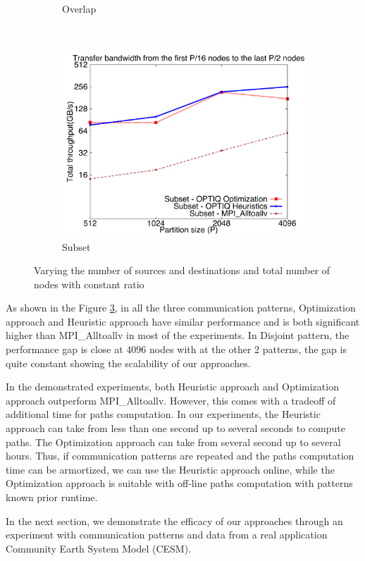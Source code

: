 \begin{figure}[!htbp]
\begin{subfigure}[b]{0.32\textwidth}
                \caption{Overlap}
                \label{fig:constantr_overlap_msg}
        \end{subfigure}
        ~ %
        \begin{subfigure}[b]{0.32\textwidth}
                \includegraphics[width=\textwidth]{figures/constantr_subset_msg.pdf}
                \caption{Subset}
                \label{fig:constantr_subset_msg}
        \end{subfigure}
	\vspace{-0.1in}
        \caption{Varying the number of sources and destinations and total number of nodes with constant ratio}
        \label{fig:constantr_msg}
\end{figure}

As shown in the Figure \ref{fig:constantr_msg}, in all the three communication patterns, Optimization approach and Heuristic approach have similar performance and is both significant higher than MPI\_Alltoallv in most of the experiments. In Disjoint pattern, the performance gap is close at 4096 nodes with at the other 2 patterns, the gap is quite constant showing the scalability of our approaches.

In the demonstrated experiments, both Heuristic approach and Optimization approach outperform MPI\_Alltoallv. However, this comes with a tradeoff of additional time for paths computation. In our experiments, the Heuristic approach can take from less than one second up to several seconds to compute paths. The Optimization approach can take from several second up to several hours. Thus, if communication patterns are repeated and the paths computation time can be armortized, we can use the Heuristic approach online, while the Optimization approach is suitable with off-line paths computation with patterns known prior runtime.

In the next section, we demonstrate the efficacy of our approaches through an experiment with communication patterns and data from a real application Community Earth System Model (CESM).
